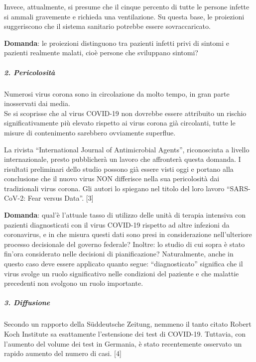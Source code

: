 Invece, attualmente, si presume che il cinque percento di tutte le
persone infette si ammali gravemente e richieda una ventilazione. Su
questa base, le proiezioni suggeriscono che il sistema sanitario
potrebbe essere sovraccaricato.

\textbf{Domanda}: le proiezioni distinguono tra pazienti infetti privi
di sintomi e pazienti realmente malati, cioè persone che sviluppano
sintomi?

\hypertarget{2-pericolosituxe0}{%
\subparagraph{\texorpdfstring{\textbf{2.
Pericolosità}}{2. Pericolosità}}\label{2-pericolosituxe0}}

Numerosi virus corona sono in circolazione da molto tempo, in gran parte
inosservati dai media.\\
Se si scoprisse che al virus COVID-19 non dovrebbe essere attribuito un
rischio significativamente più elevato rispetto ai virus corona già
circolanti, tutte le misure di contenimento sarebbero ovviamente
superflue.

La rivista ``International Journal of Antimicrobial Agents'',
riconosciuta a livello internazionale, presto pubblicherà un lavoro che
affronterà questa domanda. I risultati preliminari dello studio possono
già essere visti oggi e portano alla conclusione che il nuovo virus NON
differisce nella sua pericolosità dai tradizionali virus corona. Gli
autori lo spiegano nel titolo del loro lavoro ``SARS-CoV-2: Fear versus
Data''. {[}3{]}

\textbf{Domanda}: qual'è l'attuale tasso di utilizzo delle unità di
terapia intensiva con pazienti diagnosticati con il virus COVID-19
rispetto ad altre infezioni da coronavirus, e in che misura questi dati
sono presi in considerazione nell'ulteriore processo decisionale del
governo federale? Inoltre: lo studio di cui sopra è stato fin'ora
considerato nelle decisioni di pianificazione? Naturalmente, anche in
questo caso deve essere applicato quanto segue: ``diagnosticato''
significa che il virus svolge un ruolo significativo nelle condizioni
del paziente e che malattie precedenti non svolgono un ruolo importante.

\hypertarget{3-diffusione}{%
\subparagraph{\texorpdfstring{\textbf{3.
Diffusione}}{3. Diffusione}}\label{3-diffusione}}

Secondo un rapporto della Süddeutsche Zeitung, nemmeno il tanto citato
Robert Koch Institute sa esattamente l'estensione dei test di COVID-19.
Tuttavia, con l'aumento del volume dei test in Germania, è stato
recentemente osservato un rapido aumento del numero di casi. {[}4{]}

